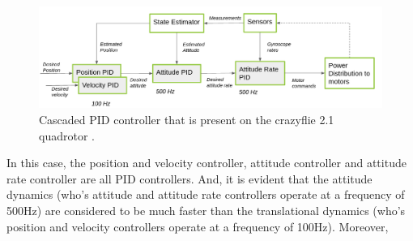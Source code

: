 \documentclass{thesisreport}
\begin{document}

\begin{figure}[h]
	\centering
	\includegraphics[width=\textwidth]{Images/Control/cascaded_pid_controller.png}
	\caption{Cascaded PID controller that is present on the crazyflie 2.1 quadrotor \cite{bitcraze}.}
	\label{fig:cascaded_pid_controller}
\end{figure}

In this case, the position and velocity controller, attitude controller and attitude rate controller are all PID controllers. And, it is evident that the attitude dynamics (who's attitude and attitude rate controllers operate at a frequency of 500Hz) are considered to be much faster than the translational dynamics (who's position and velocity controllers operate at a frequency of 100Hz). Moreover, 
\end{document}
